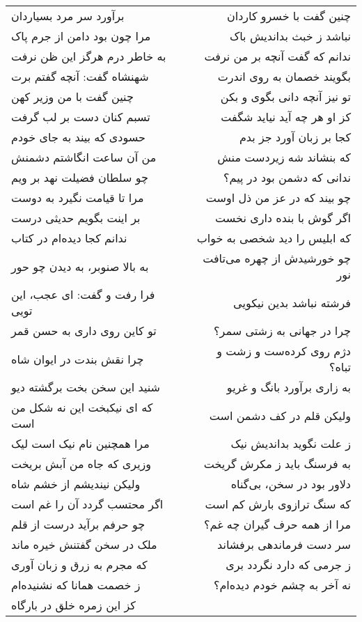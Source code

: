 \begin{center}
\begin{longtable}{l p{0.5cm} r}
برآورد سر مرد بسیاردان
&&
چنین گفت با خسرو کاردان
\\
مرا چون بود دامن از جرم پاک
&&
نباشد ز خبث بداندیش باک
\\
به خاطر درم هرگز این ظن نرفت
&&
ندانم که گفت آنچه بر من نرفت
\\
شهنشاه گفت: آنچه گفتم برت
&&
بگویند خصمان به روی اندرت
\\
چنین گفت با من وزیر کهن
&&
تو نیز آنچه دانی بگوی و بکن
\\
تسبم کنان دست بر لب گرفت
&&
کز او هر چه آید نیاید شگفت
\\
حسودی که بیند به جای خودم
&&
کجا بر زبان آورد جز بدم
\\
من آن ساعت انگاشتم دشمنش
&&
که بنشاند شه زیردست منش
\\
چو سلطان فضیلت نهد بر ویم
&&
ندانی که دشمن بود در پیم؟
\\
مرا تا قیامت نگیرد به دوست
&&
چو بیند که در عز من ذل اوست
\\
بر اینت بگویم حدیثی درست
&&
اگر گوش با بنده داری نخست
\\
ندانم کجا دیده‌ام در کتاب
&&
که ابلیس را دید شخصی به خواب
\\
به بالا صنوبر، به دیدن چو حور
&&
چو خورشیدش از چهره می‌تافت نور
\\
فرا رفت و گفت: ای عجب، این تویی
&&
فرشته نباشد بدین نیکویی
\\
تو کاین روی داری به حسن قمر
&&
چرا در جهانی به زشتی سمر؟
\\
چرا نقش بندت در ایوان شاه
&&
دژم روی کرده‌ست و زشت و تباه؟
\\
شنید این سخن بخت برگشته دیو
&&
به زاری برآورد بانگ و غریو
\\
که ای نیکبخت این نه شکل من است
&&
ولیکن قلم در کف دشمن است
\\
مرا همچنین نام نیک است لیک
&&
ز علت نگوید بداندیش نیک
\\
وزیری که جاه من آبش بریخت
&&
به فرسنگ باید ز مکرش گریخت
\\
ولیکن نیندیشم از خشم شاه
&&
دلاور بود در سخن، بی‌گناه
\\
اگر محتسب گردد آن را غم است
&&
که سنگ ترازوی بارش کم است
\\
چو حرفم برآید درست از قلم
&&
مرا از همه حرف گیران چه غم؟
\\
ملک در سخن گفتنش خیره ماند
&&
سر دست فرماندهی برفشاند
\\
که مجرم به زرق و زبان آوری
&&
ز جرمی که دارد نگردد بری
\\
ز خصمت همانا که نشنیده‌ام
&&
نه آخر به چشم خودم دیده‌ام؟
\\
کز این زمره خلق در بارگاه

\end{longtable}
\end{center}
